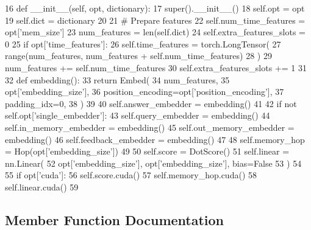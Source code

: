 \begin{DoxyCode}
16     \textcolor{keyword}{def }\_\_init\_\_(self, opt, dictionary):
17         super().\_\_init\_\_()
18         self.opt = opt
19         self.dict = dictionary
20 
21         \textcolor{comment}{# Prepare features}
22         self.num\_time\_features = opt[\textcolor{stringliteral}{'mem\_size'}]
23         num\_features = len(self.dict)
24         self.extra\_features\_slots = 0
25         \textcolor{keywordflow}{if} opt[\textcolor{stringliteral}{'time\_features'}]:
26             self.time\_features = torch.LongTensor(
27                 range(num\_features, num\_features + self.num\_time\_features)
28             )
29             num\_features += self.num\_time\_features
30             self.extra\_features\_slots += 1
31 
32         \textcolor{keyword}{def }embedding():
33             \textcolor{keywordflow}{return} Embed(
34                 num\_features,
35                 opt[\textcolor{stringliteral}{'embedding\_size'}],
36                 position\_encoding=opt[\textcolor{stringliteral}{'position\_encoding'}],
37                 padding\_idx=0,
38             )
39 
40         self.answer\_embedder = embedding()
41 
42         \textcolor{keywordflow}{if} \textcolor{keywordflow}{not} self.opt[\textcolor{stringliteral}{'single\_embedder'}]:
43             self.query\_embedder = embedding()
44             self.in\_memory\_embedder = embedding()
45             self.out\_memory\_embedder = embedding()
46             self.feedback\_embedder = embedding()
47 
48         self.memory\_hop = Hop(opt[\textcolor{stringliteral}{'embedding\_size'}])
49 
50         self.score = DotScore()
51         self.linear = nn.Linear(
52             opt[\textcolor{stringliteral}{'embedding\_size'}], opt[\textcolor{stringliteral}{'embedding\_size'}], bias=\textcolor{keyword}{False}
53         )
54 
55         \textcolor{keywordflow}{if} opt[\textcolor{stringliteral}{'cuda'}]:
56             self.score.cuda()
57             self.memory\_hop.cuda()
58             self.linear.cuda()
59 
\end{DoxyCode}


\subsection{Member Function Documentation}
\mbox{\label{classprojects_1_1memnn__feedback_1_1agent_1_1modules_1_1MemNN_a2e5d4d84ef6b83ba8e6d8e765727973d}} 
